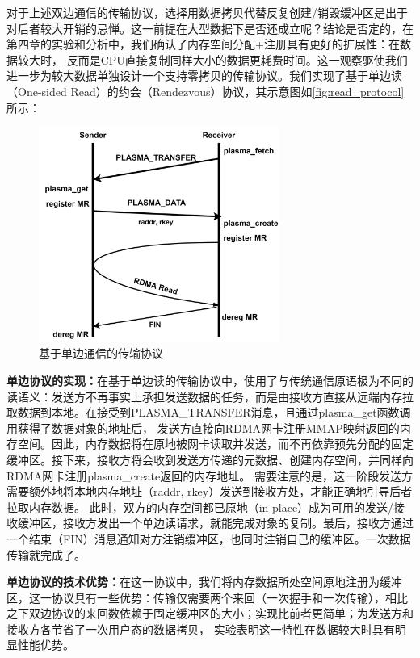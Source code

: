 对于上述双边通信的传输协议，选择用数据拷贝代替反复创建/销毁缓冲区是出于对后者较大开销的忌惮。这一前提在大型数据下是否还成立呢？结论是否定的，在第四章的实验和分析中，我们确认了内存空间分配+注册具有更好的扩展性：在数据较大时，
反而是CPU直接复制同样大小的数据更耗费时间。这一观察驱使我们进一步为较大数据单独设计一个支持零拷贝的传输协议。我们实现了基于单边读（One-sided Read）的约会（Rendezvous）协议，其示意图如\autoref{fig:read_protocol}所示：

\begin{figure}[h]
	\centering
	\includegraphics[width=0.7\textwidth]{image/chap03/read_protocol.png}
	\caption{基于单边通信的传输协议}
	\label{fig:read_protocol}
\end{figure}

\textbf{单边协议的实现：}在基于单边读的传输协议中，使用了与传统通信原语极为不同的读语义：发送方不再事实上承担发送数据的任务，而是由接收方直接从远端内存拉取数据到本地。在接受到PLASMA\_TRANSFER消息，且通过plasma\_get函数调用获得了数据对象的地址后，
发送方直接向RDMA网卡注册MMAP映射返回的内存空间。因此，内存数据将在原地被网卡读取并发送，而不再依靠预先分配的固定缓冲区。接下来，接收方将会收到发送方传递的元数据、创建内存空间，并同样向RDMA网卡注册plasma\_create返回的内存地址。
需要注意的是，这一阶段发送方需要额外地将本地内存地址（raddr, rkey）发送到接收方处，才能正确地引导后者拉取内存数据。
此时，双方的内存空间都已原地（in-place）成为可用的发送/接收缓冲区，接收方发出一个单边读请求，就能完成对象的复制。最后，接收方通过一个结束（FIN）消息通知对方注销缓冲区，也同时注销自己的缓冲区。一次数据传输就完成了。

\textbf{单边协议的技术优势：}在这一协议中，我们将内存数据所处空间原地注册为缓冲区，这一协议具有一些优势：传输仅需要两个来回（一次握手和一次传输），相比之下双边协议的来回数依赖于固定缓冲区的大小；实现比前者更简单；为发送方和接收方各节省了一次用户态的数据拷贝，
实验表明这一特性在数据较大时具有明显性能优势。

